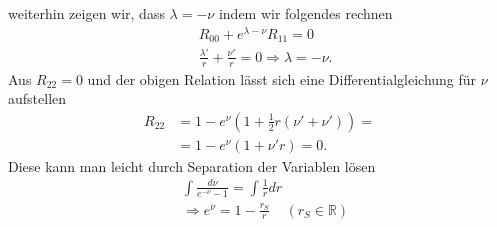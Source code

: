 \documentclass[a4paper]{article}
\begin{document}
weiterhin zeigen wir, dass $\lambda = -\nu$ indem wir folgendes rechnen
\begin{align}
    &R_{00} + e^{\lambda-\nu} R_11 = 0\\
    &\frac{\lambda'}{r} + \frac{\nu'}{r} = 0 \Rightarrow \lambda = -\nu.
\end{align}
Aus $R_{22} = 0$ und der obigen Relation lässt sich eine
Differentialgleichung für $\nu$ aufstellen
\begin{align}
    R_{22} &= 1 - e^\nu (1 + \frac{1}{2}r(\nu'+ \nu')) = \\
    &= 1 - e^\nu (1+ \nu' r) = 0.
\end{align}
Diese kann man leicht durch Separation der Variablen lösen
\begin{align}
    &\int \frac{d\nu}{e^{-\nu} -1} = \int \frac{1}{r} dr\\
    &\Rightarrow e^\nu = 1-\frac{r_S}{r} \;\;\;\; (r_S\in \mathbb{R})
\end{align}
\end{document}
